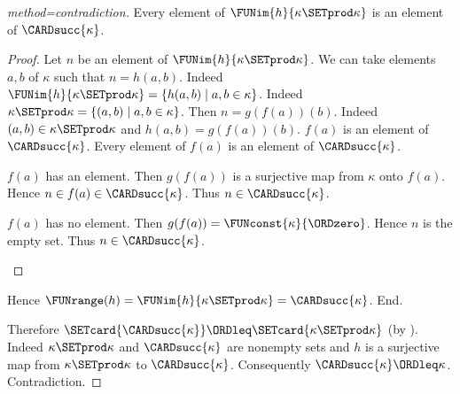 \documentclass{article}
\begin{document}
\begin{forthel}
\begin{proof}[method=contradiction]
        Every element of $\FUNim{h}{\kappa \SETprod \kappa}$ is an element of $\CARDsucc{\kappa}$.
        \begin{proof}
          Let $n$ be an element of $\FUNim{h}{\kappa \SETprod \kappa}$.
          We can take elements $a, b$ of $\kappa$ such that $n = h(a,b)$.
          Indeed $\FUNim{h}{\kappa \SETprod \kappa} = \{h(a,b) \mid a,b \in \kappa\}$.
          Indeed $\kappa \SETprod \kappa = \{(a,b) \mid a,b \in \kappa\}$.
          Then $n = g(f(a))(b)$.
          Indeed $(a,b) \in \kappa \SETprod \kappa$ and $h(a,b) = g(f(a))(b)$.
          $f(a)$ is an element of $\CARDsucc{\kappa}$.
          Every element of $f(a)$ is an element of $\CARDsucc{\kappa}$.

          \begin{case}{$f(a)$ has an element.}
            Then $g(f(a))$ is a surjective map from $\kappa$ onto $f(a)$.
            Hence $n \in f(a) \in \CARDsucc{\kappa}$.
            Thus $n \in \CARDsucc{\kappa}$.
          \end{case}

          \begin{case}{$f(a)$ has no element.}
            Then $g(f(a)) = \FUNconst{\kappa}{\ORDzero}$.
            Hence $n$ is the empty set.
            Thus $n \in \CARDsucc{\kappa}$.
          \end{case}
        \end{proof}

        Hence $\FUNrange(h) = \FUNim{h}{\kappa \SETprod \kappa} = \CARDsucc{\kappa}$.
      End.

      Therefore $\SETcard{\CARDsucc{\kappa}} \ORDleq \SETcard{\kappa \SETprod \kappa}$ (by ).
      Indeed $\kappa \SETprod \kappa$ and $\CARDsucc{\kappa}$ are nonempty sets and $h$ is a surjective map from $\kappa \SETprod \kappa$ to $\CARDsucc{\kappa}$.
      Consequently $\CARDsucc{\kappa} \ORDleq \kappa$.
      Contradiction.
    \end{proof}
  \end{forthel}

  \printbibliography
\end{document}
